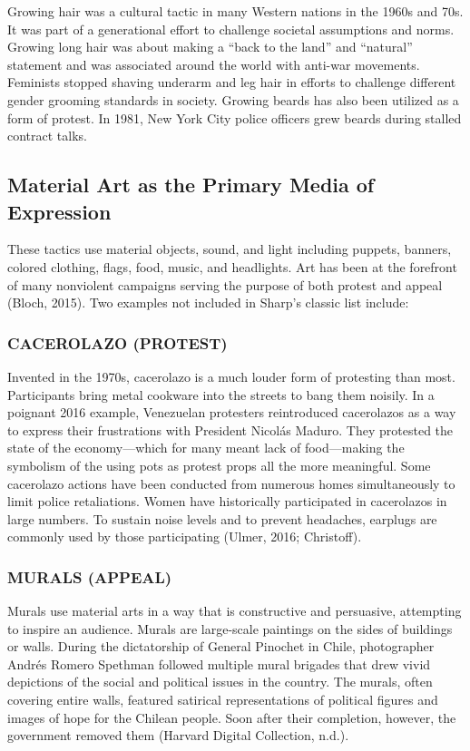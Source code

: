 \documentclass[twoside,a4paper,12pt,fleqn,openany]{extbook}
\begin{document}
Growing hair was a cultural tactic in many Western nations in the 1960s and 70s. It was part of a generational effort to challenge societal assumptions and norms. Growing long hair was about making a “back to the land” and “natural” statement and was associated around the world with anti-war movements. Feminists stopped shaving underarm and leg hair in efforts to challenge different gender grooming standards in society. Growing beards has also been utilized as a form of protest. In 1981, New York City police officers grew beards during stalled contract talks.

\subsection*{Material Art as the Primary Media of Expression}

These tactics use material objects, sound, and light including puppets, banners, colored clothing, flags, food, music, and headlights. Art has been at the forefront of many nonviolent campaigns serving the purpose of both protest and appeal (Bloch, 2015). Two examples not included in Sharp’s classic list include:

\subsubsection*{CACEROLAZO (PROTEST)}

Invented in the 1970s, cacerolazo is a much louder form of protesting than most. Participants bring metal cookware into the streets to bang them noisily. In a poignant 2016 example, Venezuelan protesters reintroduced cacerolazos as a way to express their frustrations with President Nicolás Maduro. They protested the state of the economy—which for many meant lack of food—making the symbolism of the using pots as protest props all the more meaningful. Some cacerolazo actions have been conducted from numerous homes simultaneously to limit police retaliations. Women have historically participated in cacerolazos in large numbers. To sustain noise levels and to prevent headaches, earplugs are commonly used by those participating (Ulmer, 2016; Christoff).

\subsubsection*{MURALS (APPEAL)}

Murals use material arts in a way that is constructive and persuasive, attempting to inspire an audience. Murals are large-scale paintings on the sides of buildings or walls. During the dictatorship of General Pinochet in Chile, photographer Andrés Romero Spethman followed multiple mural brigades that drew vivid depictions of the social and political issues in the country. The murals, often covering entire walls, featured satirical representations of political figures and images of hope for the Chilean people. Soon after their completion, however, the government removed them (Harvard Digital Collection, n.d.).
\end{document}
